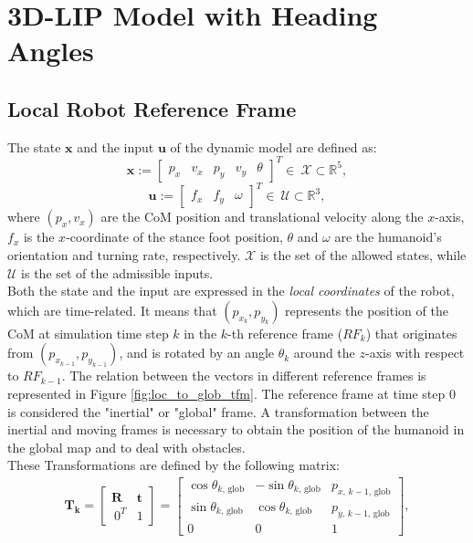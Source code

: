 \section{3D-LIP Model with Heading Angles}\label{sec:lip}

\subsection{Local Robot Reference Frame}
The state $\mathbf{x}$ and the input $\mathbf{u}$ of the dynamic model are defined as:
$$ \mathbf{x} := \begin{bmatrix} p_x & v_x & p_y & v_y & \theta \end{bmatrix}^T \in \ \mathcal{X} \subset \mathbb{R}^5 , $$
$$ \mathbf{u} := \begin{bmatrix} f_x & f_y & \omega \end{bmatrix}^T \in \ \mathcal{U} \subset \mathbb{R}^3 , $$
where $(p_x, v_x)$ are the CoM position and translational velocity along the $x$-axis, $f_x$ is the $x$-coordinate of the stance foot position, $\theta$ and $\omega$ are the humanoid's orientation and turning rate, respectively. $\mathcal{X}$ is the set of the allowed states, while $\mathcal{U}$ is the set of the admissible inputs.\\
Both the state and the input are expressed in the \textit{local coordinates} of the robot, which are time-related. It means that $(p_{x_k}, p_{y_k})$ represents the position of the CoM at simulation time step $k$ in the $k$-th reference frame ($RF_k$) that originates from $(p_{x_{k-1}}, p_{y_{k-1}})$, and is rotated by an angle $\theta_k$ around the $z$-axis with respect to $RF_{k-1}$. The relation between the vectors in different reference frames is represented in Figure \ref{fig:loc_to_glob_tfm}.
The reference frame at time step 0 is considered the "inertial" or "global" frame. A transformation between the inertial and moving frames is necessary to obtain the position of the humanoid in the global map and to deal with obstacles.\\
These Transformations are defined by the following matrix:
\begin{align}
    \mathbf{T_{k}} = 
    \begin{bmatrix}
        \mathbf{R} & \mathbf{t} \\[1ex]
        \ 0^{T} & 1
    \end{bmatrix}
    =
    \begin{bmatrix}
        \cos\theta_{k,\, \text{glob}} & -\sin\theta_{k,\, \text{glob}} & p_{x,\,k-1,\,\text{glob}} \\
        \sin\theta_{k,\, \text{glob}} & \cos\theta_{k,\, \text{glob}} &  p_{y,\,k-1,\,\text{glob}} \\
        0 & 0 & 1
    \end{bmatrix},
\end{align}
